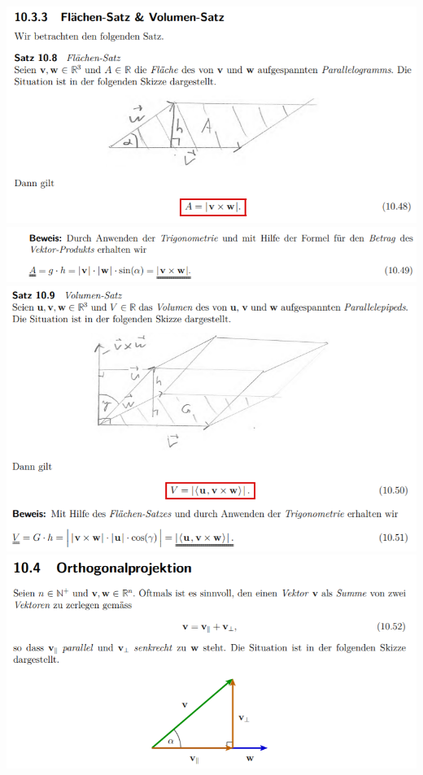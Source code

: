 \includegraphics[width=\columnwidth]{./images/vek17.png}
\includegraphics[width=\columnwidth]{./images/vek18.png}
\includegraphics[width=\columnwidth]{./images/vek19.png}
\includegraphics[width=\columnwidth]{./images/vek20.png}
